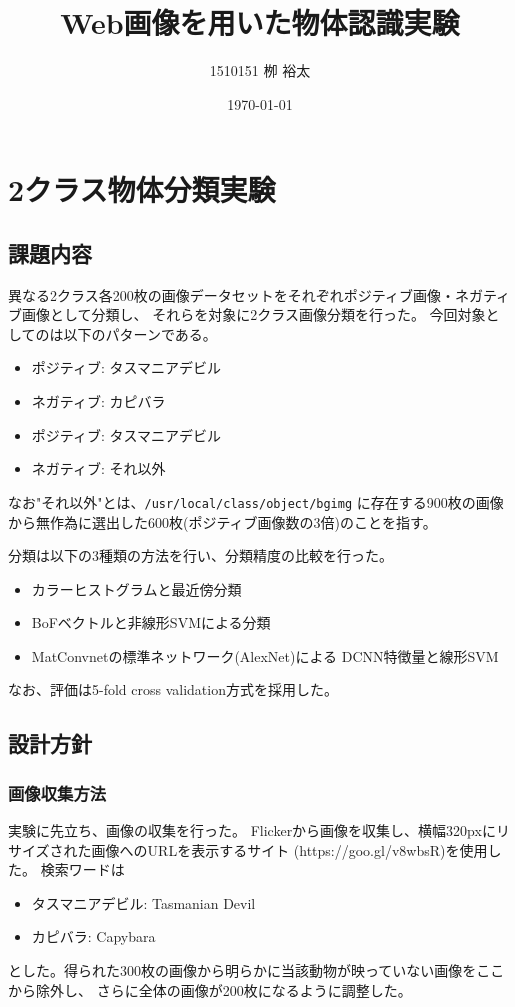 \documentclass[11pt,a4paper, uplatex]{jsreport}
\title{Web画像を用いた物体認識実験}
\author{1510151  栁 裕太}
\date{\today}
\begin{document}
\maketitle
\thispagestyle{empty}
\tableofcontents
\chapter{2クラス物体分類実験}
\section{課題内容}
異なる2クラス各200枚の画像データセットをそれぞれポジティブ画像・ネガティブ画像として分類し、
それらを対象に2クラス画像分類を行った。
今回対象としてのは以下のパターンである。
\begin{itemize}
  \item ポジティブ: タスマニアデビル
  \item ネガティブ: カピバラ
\end{itemize}
\begin{itemize}
  \item ポジティブ: タスマニアデビル
  \item ネガティブ: それ以外
\end{itemize}
なお"それ以外"とは、\texttt{/usr/local/class/object/bgimg}
に存在する900枚の画像から無作為に選出した600枚(ポジティブ画像数の3倍)のことを指す。

分類は以下の3種類の方法を行い、分類精度の比較を行った。
\begin{itemize}
  \item カラーヒストグラムと最近傍分類
  \item BoFベクトルと非線形SVMによる分類
  \item MatConvnetの標準ネットワーク(AlexNet)による DCNN特徴量と線形SVM
\end{itemize}

なお、評価は5-fold cross validation方式を採用した。

\section{設計方針}
\subsection{画像収集方法}
実験に先立ち、画像の収集を行った。
Flickerから画像を収集し、横幅320pxにリサイズされた画像へのURLを表示するサイト
(https://goo.gl/v8wbsR)を使用した。
検索ワードは
\begin{itemize}
  \item タスマニアデビル: Tasmanian Devil
  \item カピバラ: Capybara
\end{itemize}
とした。得られた300枚の画像から明らかに当該動物が映っていない画像をここから除外し、
さらに全体の画像が200枚になるように調整した。
\end{document}
